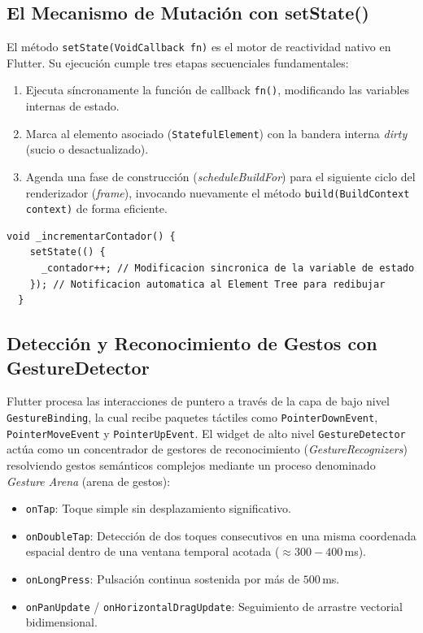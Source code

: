 \documentclass[12pt,a4paper]{article}
\begin{document}
  \subsection{El Mecanismo de Mutación con setState()}
  El método \texttt{setState(VoidCallback fn)} es el motor de reactividad nativo en Flutter. Su ejecución cumple tres etapas secuenciales fundamentales:
  \begin{enumerate}[leftmargin=*]
      \item Ejecuta síncronamente la función de callback \texttt{fn()}, modificando las variables internas de estado.
      \item Marca al elemento asociado (\texttt{StatefulElement}) con la bandera interna \textit{dirty} (sucio o desactualizado).
      \item Agenda una fase de construcción (\textit{scheduleBuildFor}) para el siguiente ciclo del renderizador (\textit{frame}), invocando nuevamente el método \texttt{build(BuildContext context)} de forma eficiente.
  \end{enumerate}

  \begin{lstlisting}[caption={Estructura canónica del uso de setState en Flutter}]
  void _incrementarContador() {
    setState(() {
      _contador++; // Modificacion sincronica de la variable de estado
    }); // Notificacion automatica al Element Tree para redibujar
  }
  \end{lstlisting}

  \subsection{Detección y Reconocimiento de Gestos con GestureDetector}
  Flutter procesa las interacciones de puntero a través de la capa de bajo nivel \texttt{GestureBinding}, la cual recibe paquetes táctiles como \texttt{PointerDownEvent}, \texttt{PointerMoveEvent} y \texttt{PointerUpEvent}. El widget de alto nivel \texttt{GestureDetector} actúa como un concentrador de gestores de reconocimiento (\textit{GestureRecognizers}) resolviendo gestos semánticos complejos mediante un proceso denominado \textit{Gesture Arena} (arena de gestos):
  \begin{itemize}[leftmargin=*]
      \item \texttt{onTap}: Toque simple sin desplazamiento significativo.
      \item \texttt{onDoubleTap}: Detección de dos toques consecutivos en una misma coordenada espacial dentro de una ventana temporal acotada ($\approx 300-400$\,ms).
      \item \texttt{onLongPress}: Pulsación continua sostenida por más de $500$\,ms.
      \item \texttt{onPanUpdate} / \texttt{onHorizontalDragUpdate}: Seguimiento de arrastre vectorial bidimensional.
  \end{itemize}
\end{document}
